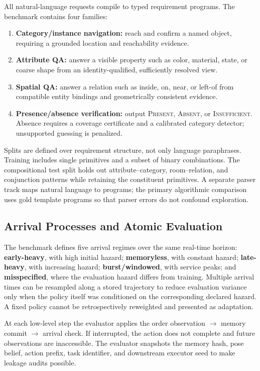 All natural-language requests compile to typed requirement programs.
The benchmark contains four families:
\begin{enumerate}[leftmargin=*,itemsep=2pt,topsep=3pt]
  \item \textbf{Category/instance navigation:} reach and confirm a named object, requiring a grounded location and reachability evidence.
  \item \textbf{Attribute QA:} answer a visible property such as color, material, state, or coarse shape from an identity-qualified, sufficiently resolved view.
  \item \textbf{Spatial QA:} answer a relation such as inside, on, near, or left-of from compatible entity bindings and geometrically consistent evidence.
  \item \textbf{Presence/absence verification:} output \textsc{Present}, \textsc{Absent}, or \textsc{Insufficient}. Absence requires a coverage certificate and a calibrated category detector; unsupported guessing is penalized.
\end{enumerate}

Splits are defined over requirement structure, not only language paraphrases.
Training includes single primitives and a subset of binary combinations.
The compositional test split holds out attribute--category, room--relation, and conjunction patterns while retaining the constituent primitives.
A separate parser track maps natural language to programs; the primary algorithmic comparison uses gold template programs so that parser errors do not confound exploration.

\subsection{Arrival Processes and Atomic Evaluation}

The benchmark defines five arrival regimes over the same real-time horizon:
\textbf{early-heavy}, with high initial hazard;
\textbf{memoryless}, with constant hazard;
\textbf{late-heavy}, with increasing hazard;
\textbf{burst/windowed}, with service peaks; and
\textbf{misspecified}, where the evaluation hazard differs from training.
Multiple arrival times can be resampled along a stored trajectory to reduce evaluation variance only when the policy itself was conditioned on the corresponding declared hazard.
A fixed policy cannot be retrospectively reweighted and presented as adaptation.

At each low-level step the evaluator applies the order
observation $\rightarrow$ memory commit $\rightarrow$ arrival check.
If interrupted, the action does not complete and future observations are inaccessible.
The evaluator snapshots the memory hash, pose belief, action prefix, task identifier, and downstream executor seed to make leakage audits possible.

